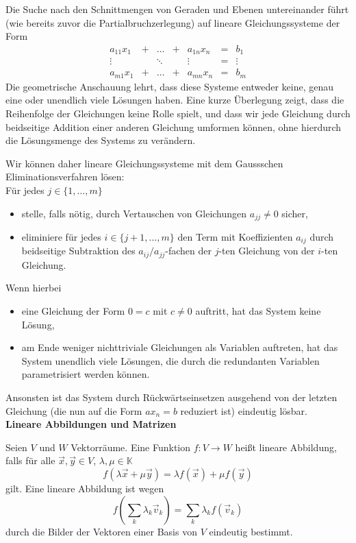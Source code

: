 \documentclass[a4paper,10pt]{article}
\begin{document}
Die Suche nach den Schnittmengen von Geraden und Ebenen untereinander
führt (wie bereits zuvor die Partialbruchzerlegung) auf lineare
Gleichungssysteme der Form
\[
\begin{array}{ccccccc}
a_{11}x_1&+&\ldots&+&a_{1n}x_n &=& b_1\\
\vdots &&\ddots&&\vdots &=&\vdots \\
a_{m1}x_1&+&\ldots&+&a_{mn}x_n&=&b_m
\end{array}
\]
Die geometrische Anschauung lehrt, dass diese Systeme entweder keine,
genau eine oder unendlich viele Lösungen haben.
Eine kurze Überlegung zeigt, dass die Reihenfolge der
Gleichungen keine
Rolle spielt, und dass wir jede Gleichung durch beidseitige Addition
einer anderen Gleichung umformen können, ohne hierdurch die Lösungsmenge
des Systems zu verändern.

Wir können daher lineare Gleichungssysteme mit dem Gaussschen
Eliminationsverfahren lösen:\\
Für jedes $j\in\{1,\ldots,m\}$
\begin{itemize}
\item stelle, falls nötig, durch Vertauschen von Gleichungen
$a_{jj}\not=0$ sicher,
\item eliminiere für jedes $i\in\{j+1,\ldots,m\}$ den Term mit
Koeffizienten $a_{ij}$ durch beidseitige Subtraktion des
$a_{ij}/a_{jj}$-fachen der $j$-ten Gleichung von der $i$-ten Gleichung.
\end{itemize}
Wenn hierbei
\begin{itemize}
\item eine Gleichung der Form $0=c$ mit $c\not=0$ auftritt,
hat das System keine Lösung,
\item am Ende weniger nichttriviale Gleichungen als Variablen
auftreten, hat das System unendlich viele Lösungen, die durch die
redundanten Variablen parametrisiert werden können.
\end{itemize}
Ansonsten ist das System durch Rückwärtseinsetzen ausgehend von der
letzten Gleichung (die nun auf die Form $ax_n=b$ reduziert ist)
eindeutig lösbar.\\

{\bf Lineare Abbildungen und Matrizen}

Seien $V$ und $W$ Vektorräume. Eine Funktion $f:V\to W$ heißt lineare
Abbildung, falls für alle $\vec{x},\vec{y}\in V$, $\lambda,\mu\in\mathbb{K}$
\[
f(\lambda \vec{x}+\mu \vec{y})=\lambda f(\vec{x})+\mu f(\vec{y})
\]
gilt.
Eine lineare Abbildung ist wegen
\[
f\left(\sum_k \lambda_k \vec{v}_k\right)=\sum_k \lambda_k f(\vec{v}_k)
\]
durch die Bilder der Vektoren einer Basis von $V$ eindeutig bestimmt.
\end{document}
